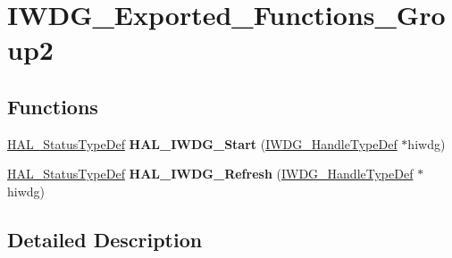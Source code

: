 \hypertarget{group___i_w_d_g___exported___functions___group2}{}\section{I\+W\+D\+G\+\_\+\+Exported\+\_\+\+Functions\+\_\+\+Group2}
\label{group___i_w_d_g___exported___functions___group2}
\subsection*{Functions}
\begin{DoxyCompactItemize}
\item 
\hyperlink{stm32f4xx__hal__def_8h_a63c0679d1cb8b8c684fbb0632743478f}{H\+A\+L\+\_\+\+Status\+Type\+Def} {\bfseries H\+A\+L\+\_\+\+I\+W\+D\+G\+\_\+\+Start} (\hyperlink{struct_i_w_d_g___handle_type_def}{I\+W\+D\+G\+\_\+\+Handle\+Type\+Def} $\ast$hiwdg)\hypertarget{group___i_w_d_g___exported___functions___group2_gaaa540681b7a6a4f7cc6b0b5497e6de46}{}\label{group___i_w_d_g___exported___functions___group2_gaaa540681b7a6a4f7cc6b0b5497e6de46}

\item 
\hyperlink{stm32f4xx__hal__def_8h_a63c0679d1cb8b8c684fbb0632743478f}{H\+A\+L\+\_\+\+Status\+Type\+Def} {\bfseries H\+A\+L\+\_\+\+I\+W\+D\+G\+\_\+\+Refresh} (\hyperlink{struct_i_w_d_g___handle_type_def}{I\+W\+D\+G\+\_\+\+Handle\+Type\+Def} $\ast$hiwdg)\hypertarget{group___i_w_d_g___exported___functions___group2_ga7e86236aea6d2f3638397fdf90333e4a}{}\label{group___i_w_d_g___exported___functions___group2_ga7e86236aea6d2f3638397fdf90333e4a}

\end{DoxyCompactItemize}


\subsection{Detailed Description}
